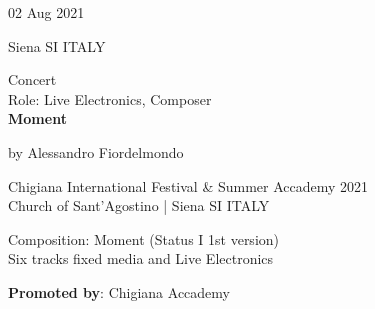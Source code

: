 \documentclass[7pt,a4paper]{article}
\begin{document}
\begin{mdframed}[
    backgroundcolor=white,
    linecolor=white,
    linewidth=0pt,
    innerleftmargin=6pt,
    innerrightmargin=6pt,
    innertopmargin=6pt,
    innerbottommargin=6pt,
    skipabove=0pt,
    skipbelow=0pt
]

\begin{minipage}[t]{0.28\textwidth}

02 Aug 2021

\scriptsize Siena SI ITALY


\end{minipage}
\begin{minipage}[t]{0.68\textwidth}
\small Concert
\\\scriptsize Role: Live Electronics, Composer
\\ \normalsize \textbf{Moment}
\par\scriptsize by Alessandro Fiordelmondo

\vspace{0.25cm}



\small Chigiana International Festival \& Summer Accademy 2021\\Church of Sant'Agostino | \scriptsize Siena SI ITALY

\vspace{0.1cm}
\scriptsize

Composition: Moment (Status I 1st version)\\Six tracks fixed media and Live Electronics

\vspace{0.1cm}
\par \textbf{Promoted by}: Chigiana Accademy
\end{minipage}
\vspace{0.25cm}
\end{mdframed}
\end{document}
